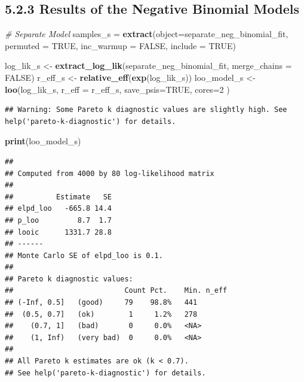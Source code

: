 \documentclass[]{article}
\newenvironment{Shaded}{\begin{snugshade}}{\end{snugshade}}
\newcommand{\KeywordTok}[1]{\textcolor[rgb]{0.13,0.29,0.53}{\textbf{#1}}}
\newcommand{\DataTypeTok}[1]{\textcolor[rgb]{0.13,0.29,0.53}{#1}}
\newcommand{\DecValTok}[1]{\textcolor[rgb]{0.00,0.00,0.81}{#1}}
\newcommand{\StringTok}[1]{\textcolor[rgb]{0.31,0.60,0.02}{#1}}
\newcommand{\CommentTok}[1]{\textcolor[rgb]{0.56,0.35,0.01}{\textit{#1}}}
\newcommand{\OtherTok}[1]{\textcolor[rgb]{0.56,0.35,0.01}{#1}}
\newcommand{\NormalTok}[1]{#1}
\begin{document}
\subsection{5.2.3 Results of the Negative Binomial
Models}\label{results-of-the-negative-binomial-models}

\begin{Shaded}
\begin{Highlighting}[]
\CommentTok{# Separate Model}
\NormalTok{samples_s =}\StringTok{ }\KeywordTok{extract}\NormalTok{(}\DataTypeTok{object=}\NormalTok{separate_neg_binomial_fit, }\DataTypeTok{permuted =} \OtherTok{TRUE}\NormalTok{, }\DataTypeTok{inc_warmup =} \OtherTok{FALSE}\NormalTok{, }\DataTypeTok{include =} \OtherTok{TRUE}\NormalTok{)}

\NormalTok{log_lik_s <-}\StringTok{ }\KeywordTok{extract_log_lik}\NormalTok{(separate_neg_binomial_fit, }\DataTypeTok{merge_chains =} \OtherTok{FALSE}\NormalTok{)}
\NormalTok{r_eff_s <-}\StringTok{ }\KeywordTok{relative_eff}\NormalTok{(}\KeywordTok{exp}\NormalTok{(log_lik_s))}
\NormalTok{loo_model_s <-}\StringTok{ }\KeywordTok{loo}\NormalTok{(log_lik_s, }\DataTypeTok{r_eff =}\NormalTok{ r_eff_s, }\DataTypeTok{save_psis=}\OtherTok{TRUE}\NormalTok{, }\DataTypeTok{cores=}\DecValTok{2}\NormalTok{ )}
\end{Highlighting}
\end{Shaded}

\begin{verbatim}
## Warning: Some Pareto k diagnostic values are slightly high. See help('pareto-k-diagnostic') for details.
\end{verbatim}

\begin{Shaded}
\begin{Highlighting}[]
\KeywordTok{print}\NormalTok{(loo_model_s)}
\end{Highlighting}
\end{Shaded}

\begin{verbatim}
## 
## Computed from 4000 by 80 log-likelihood matrix
## 
##          Estimate   SE
## elpd_loo   -665.8 14.4
## p_loo         8.7  1.7
## looic      1331.7 28.8
## ------
## Monte Carlo SE of elpd_loo is 0.1.
## 
## Pareto k diagnostic values:
##                          Count Pct.    Min. n_eff
## (-Inf, 0.5]   (good)     79    98.8%   441       
##  (0.5, 0.7]   (ok)        1     1.2%   278       
##    (0.7, 1]   (bad)       0     0.0%   <NA>      
##    (1, Inf)   (very bad)  0     0.0%   <NA>      
## 
## All Pareto k estimates are ok (k < 0.7).
## See help('pareto-k-diagnostic') for details.
\end{verbatim}
\end{document}
